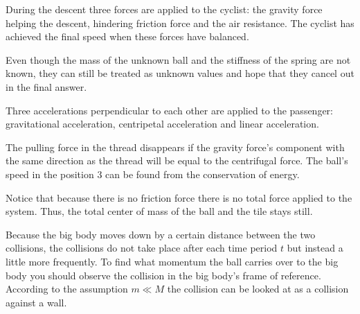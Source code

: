\documentclass[11pt]{article}
\begin{document}

\hinteng
During the descent three forces are applied to the cyclist: the gravity force helping the descent, hindering friction force and the air resistance. The cyclist has achieved the final speed when these forces have balanced.
\probend
\bigskip


\hinteng
Even though the mass of the unknown ball and the stiffness of the spring are not known, they can still be treated as unknown values and hope that they cancel out in the final answer.
\probend
\bigskip


\hinteng
Three accelerations perpendicular to each other are applied to the passenger: gravitational acceleration, centripetal acceleration and linear acceleration.
\probend
\bigskip


\hinteng
The pulling force in the thread disappears if the gravity force’s component with the same direction as the thread will be equal to the centrifugal force. The ball’s speed in the position 3 can be found from the conservation of energy.
\probend
\bigskip


\hinteng
Notice that because there is no friction force there is no total force applied to the system. Thus, the total center of mass of the ball and the tile stays still.
\probend
\bigskip


\hinteng
Because the big body moves down by a certain distance between the two collisions, the collisions do not take place after each time period $t$ but instead a little more frequently. To find what momentum the ball carries over to the big body you should observe the collision in the big body’s frame of reference. According to the assumption $m\ll M$ the collision can be looked at as a collision against a wall.
\probend
\bigskip
\end{document}
